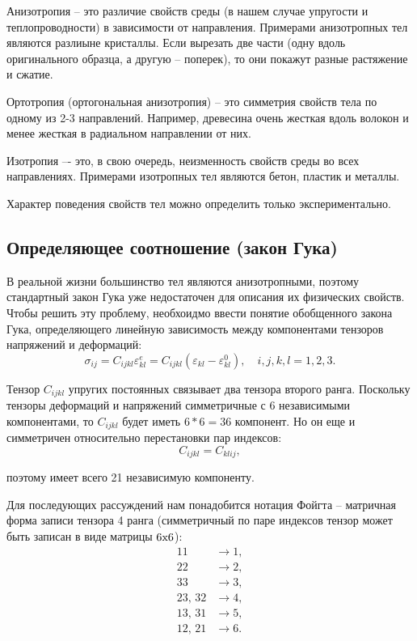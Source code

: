 \documentclass[12pt,a4paper]{article}
\begin{document}
    Анизотропия -- это различие свойств среды (в нашем случае упругости и теплопроводности) в зависимости от направления. Примерами анизотропных тел являются разлиыне кристаллы. Если вырезать две части (одну вдоль оригинального образца, а другую -- поперек), то они покажут разные растяжение и сжатие. 

    Ортотропия (ортогональная анизотропия) -- это симметрия свойств тела по одному из 2-3 направлений. Например, древесина очень жесткая вдоль волокон и менее жесткая в радиальном направлении от них.

    Изотропия –- это, в свою очередь, неизменность свойств среды во всех направлениях. Примерами изотропных тел являются бетон, пластик и металлы. 
    
    Характер поведения свойств тел можно определить только экспериментально.

    \subsection{Определяющее соотношение (закон Гука)}

    В реальной жизни большинство тел являются анизотропными, поэтому стандартный закон Гука уже недостаточен для описания их физических свойств. Чтобы решить эту проблему, необхоидмо ввести понятие обобщенного закона Гука, определяющего линейную зависимость между компонентами тензоров напряжений и деформаций:
    \begin{equation}
      \sigma_{ij} = C_{ijkl}\varepsilon_{kl}^e = C_{ijkl}( \varepsilon_{kl} - \varepsilon_{kl}^0 ), \quad i,j,k,l = 1, 2, 3.
      \label{Hook}
    \end{equation}

    Тензор $C_{ijkl}$ упругих постоянных связывает два тензора второго ранга. Поскольку тензоры деформаций и напряжений симметричные с $6$ независимыми компонентами, то $C_{ijkl}$ будет иметь $6*6 = 36$ компонент. Но он еще и симметричен относительно перестановки пар индексов: 
    \[
        C_{ijkl} = C_{klij},
    \]

  \noindent поэтому имеет всего 21 независимую компоненту.

  Для последующих рассуждений нам понадобится нотация Фойгта -- матричная форма записи тензора 4 ранга (симметричный по паре индексов тензор может быть записан в виде матрицы $6{\text x}6$):
  \begin{equation}
    \begin{split}
        11 &\rightarrow 1, \\
        22 &\rightarrow 2, \\
        33 &\rightarrow 3, \\
        23,\, 32 &\rightarrow 4, \\
        13,\, 31 &\rightarrow 5, \\
        12,\, 21 &\rightarrow 6. \\
    \end{split}
    \label{Foigt}
  \end{equation}
\end{document}
